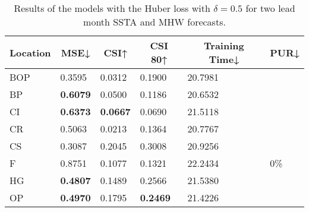 \documentclass[11pt, a4paper]{article}
\begin{document}
\begin{table}[H]
\centering
\small
\caption{Results of the models with the Huber loss with $\delta=0.5$ for two lead month SSTA and MHW forecasts.}
\begin{tabular}{llllll}
\multicolumn{1}{c}{\textbf{Location}} & \multicolumn{1}{c}{\textbf{MSE↓}} & \multicolumn{1}{c}{\textbf{CSI↑}} & \multicolumn{1}{c}{\textbf{CSI 80↑}} & \multicolumn{1}{c}{\textbf{Training Time↓}} & \multicolumn{1}{c}{\textbf{PUR↓}} \\ \hline
BOP                         & 0.3595                            & 0.0312                            & 0.1900                               & 20.7981                                     &                                   \\
BP                        & \textbf{0.6079}                   & 0.0500                            & 0.1186                               & 20.6532                                     &                                   \\
CI                        & \textbf{0.6373}                   & \textbf{0.0667}                   & 0.0690                               & 21.5118                                     &                                   \\
CR                           & 0.5063                            & 0.0213                            & 0.1364                               & 20.7767                                     &                                   \\
CS                           & 0.3087                            & 0.2045                            & 0.3008                               & 20.9256                                     &                                   \\
F                             & 0.8751                            & 0.1077                            & 0.1321                               & 22.2434                                     & 0\%                               \\
HG                          & \textbf{0.4807}                   & 0.1489                            & 0.2566                               & 21.5380                                     &                                   \\
OP                       & \textbf{0.4970}                   & 0.1795                            & \textbf{0.2469}                      & 21.4226                                     &                                   \\

\end{tabular}
\end{table}
\end{document}

